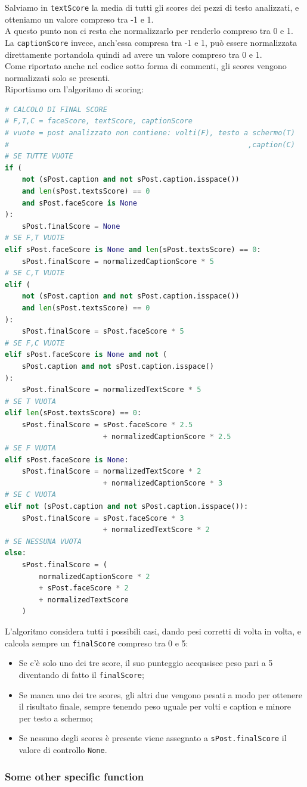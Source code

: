 Salviamo in \verb+textScore+ la media di tutti gli scores dei pezzi di testo analizzati, e otteniamo
un valore compreso tra -1 e 1.\\ 
A questo punto non ci resta che normalizzarlo per renderlo compreso tra 0 e 1.\\ 
La \verb+captionScore+ invece, anch'essa compresa tra -1 e 1, può essere normalizzata direttamente portandola
quindi ad avere un valore compreso tra 0 e 1.\\
Come riportato anche nel codice sotto forma di commenti, gli scores vengono normalizzati solo se presenti.\\
Riportiamo ora l'algoritmo di scoring:
\begin{lstlisting}[language=Python]
# CALCOLO DI FINAL SCORE
# F,T,C = faceScore, textScore, captionScore
# vuote = post analizzato non contiene: volti(F), testo a schermo(T)
#                                                        ,caption(C)
# SE TUTTE VUOTE
if (
    not (sPost.caption and not sPost.caption.isspace())
    and len(sPost.textsScore) == 0
    and sPost.faceScore is None
):
    sPost.finalScore = None
# SE F,T VUOTE
elif sPost.faceScore is None and len(sPost.textsScore) == 0:
    sPost.finalScore = normalizedCaptionScore * 5
# SE C,T VUOTE
elif (
    not (sPost.caption and not sPost.caption.isspace())
    and len(sPost.textsScore) == 0
):
    sPost.finalScore = sPost.faceScore * 5
# SE F,C VUOTE
elif sPost.faceScore is None and not (
    sPost.caption and not sPost.caption.isspace()
):
    sPost.finalScore = normalizedTextScore * 5
# SE T VUOTA
elif len(sPost.textsScore) == 0:
    sPost.finalScore = sPost.faceScore * 2.5 
                       + normalizedCaptionScore * 2.5
# SE F VUOTA
elif sPost.faceScore is None:
    sPost.finalScore = normalizedTextScore * 2 
                       + normalizedCaptionScore * 3
# SE C VUOTA
elif not (sPost.caption and not sPost.caption.isspace()):
    sPost.finalScore = sPost.faceScore * 3 
                       + normalizedTextScore * 2
# SE NESSUNA VUOTA
else:
    sPost.finalScore = (
        normalizedCaptionScore * 2 
        + sPost.faceScore * 2 
        + normalizedTextScore
    )
\end{lstlisting}
L'algoritmo considera tutti i possibili casi, dando pesi corretti di volta in volta, e calcola
sempre un \verb+finalScore+ compreso tra 0 e 5: 
\begin{itemize}
    \item Se c'è solo uno dei tre score, il suo punteggio accqusisce
    peso pari a 5 diventando di fatto il \verb+finalScore+;
    
    \item Se manca uno dei tre scores, gli altri due vengono
    pesati a modo per ottenere il risultato finale, sempre tenendo peso uguale 
    per volti e caption e minore per testo a schermo;
    
    \item Se nessuno degli scores è presente viene assegnato a \verb+sPost.finalScore+ 
    il valore di controllo \verb+None+.
\end{itemize}



\subsubsection{Some other specific function}
